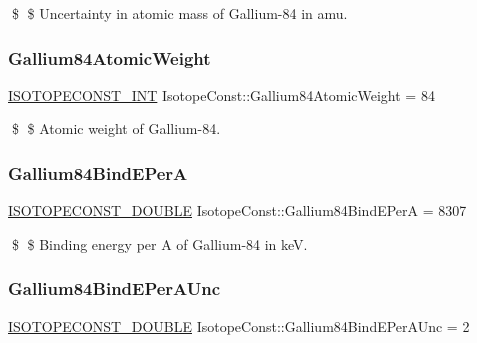 \$ \$ Uncertainty in atomic mass of Gallium-\/84 in amu. \mbox{\label{group___isotope_const-_gallium-_ga84_ga69b9a4f3e82572ac725a81cb566228ba}} 
\subsubsection{\texorpdfstring{Gallium84\+Atomic\+Weight}{Gallium84AtomicWeight}}
{\footnotesize\ttfamily \mbox{\hyperlink{group___isotope_const-_macros_ga5f18360b3e99483a35c32d789e62621c}{I\+S\+O\+T\+O\+P\+E\+C\+O\+N\+S\+T\+\_\+\+I\+NT}} Isotope\+Const\+::\+Gallium84\+Atomic\+Weight = 84}

\$ \$ Atomic weight of Gallium-\/84. \mbox{\label{group___isotope_const-_gallium-_ga84_gace63b2c725638301ea2f9cb1376ff480}} 
\subsubsection{\texorpdfstring{Gallium84\+Bind\+E\+PerA}{Gallium84BindEPerA}}
{\footnotesize\ttfamily \mbox{\hyperlink{group___isotope_const-_macros_ga8f45a7272ce02c0b4c65c44636ed719a}{I\+S\+O\+T\+O\+P\+E\+C\+O\+N\+S\+T\+\_\+\+D\+O\+U\+B\+LE}} Isotope\+Const\+::\+Gallium84\+Bind\+E\+PerA = 8307}

\$ \$ Binding energy per A of Gallium-\/84 in keV. \mbox{\label{group___isotope_const-_gallium-_ga84_gab913020ac712ef6029e2bbe713748817}} 
\subsubsection{\texorpdfstring{Gallium84\+Bind\+E\+Per\+A\+Unc}{Gallium84BindEPerAUnc}}
{\footnotesize\ttfamily \mbox{\hyperlink{group___isotope_const-_macros_ga8f45a7272ce02c0b4c65c44636ed719a}{I\+S\+O\+T\+O\+P\+E\+C\+O\+N\+S\+T\+\_\+\+D\+O\+U\+B\+LE}} Isotope\+Const\+::\+Gallium84\+Bind\+E\+Per\+A\+Unc = 2}

